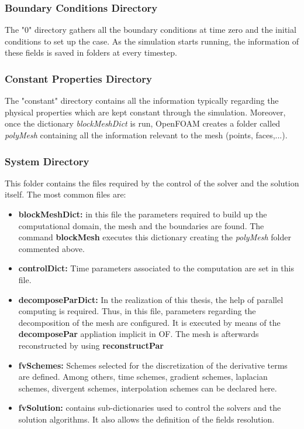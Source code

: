 \subsubsection{Boundary Conditions Directory}

\setlength{\parindent}{0.5cm} The "0" directory gathers all the boundary conditions at time zero and the initial conditions to set up the case. As the simulation starts running, the information of these fields is saved in folders at every timestep.

\subsubsection{Constant Properties Directory}

\setlength{\parindent}{0.5cm} The "constant" directory contains all the information typically regarding the physical properties which are kept constant through the simulation. Moreover, once the dictionary \textit{blockMeshDict} is run, OpenFOAM creates a folder called \textit{polyMesh} containing all the information relevant to the mesh (points, faces,...). 

\subsubsection{System Directory}
\setlength{\parindent}{0.5cm} This folder contains the files required by the control of the solver and the solution itself. The most common files are:
\begin{itemize}
	\item \textbf{blockMeshDict:} in this file the parameters required to build up the computational domain, the mesh and the boundaries are found. The command \textbf{blockMesh} executes this dictionary creating the \textit{polyMesh} folder commented above.
	\item \textbf{controlDict:} Time parameters associated to the computation are set in this file. 
	\item \textbf{decomposeParDict:} In the realization of this thesis, the help of parallel computing is required. Thus, in this file, parameters regarding the decomposition of the mesh are configured. It is executed by means of the \textbf{decomposePar} appliation implicit in OF. The mesh is afterwards reconstructed by using \textbf{reconstructPar} 
	\item \textbf{fvSchemes:} Schemes selected for the discretization of the derivative terms are defined. Among others, time schemes, gradient schemes, laplacian schemes, divergent schemes, interpolation schemes can be declared here.
	\item \textbf{fvSolution:} contains sub-dictionaries used to control the solvers and the solution algorithms. It also allows the definition of the fields resolution.
\end{itemize}

